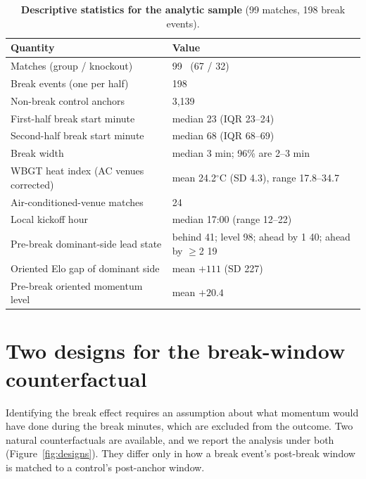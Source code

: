 \documentclass[11pt]{article}
\begin{document}
\begin{table}[t]
\centering\small
\caption{\textbf{Descriptive statistics for the analytic sample} (99 matches, 198 break events).}
\label{tab:desc}
\begin{tabular}{ll}
\toprule
Quantity & Value \\
\midrule
Matches (group / knockout)              & 99 \ (67 / 32) \\
Break events (one per half)             & 198 \\
Non-break control anchors               & 3{,}139 \\
First-half break start minute           & median 23 (IQR 23--24) \\
Second-half break start minute          & median 68 (IQR 68--69) \\
Break width                             & median 3 min; 96\% are 2--3 min \\
WBGT heat index (AC venues corrected)   & mean 24.2$^\circ$C (SD 4.3), range 17.8--34.7 \\
Air-conditioned-venue matches           & 24 \\
Local kickoff hour                      & median 17:00 (range 12--22) \\
Pre-break dominant-side lead state      & behind 41; level 98; ahead by 1 40; ahead by $\geq$2 19 \\
Oriented Elo gap of dominant side       & mean $+111$ (SD 227) \\
Pre-break oriented momentum level       & mean $+20.4$ \\
\bottomrule
\end{tabular}
\end{table}

\section{Two designs for the break-window counterfactual}
\label{sec:designs}

Identifying the break effect requires an assumption about what momentum would have done during the break
minutes, which are excluded from the outcome. Two natural counterfactuals are available, and we report the
analysis under both (Figure~\ref{fig:designs}). They differ only in how a break event's post-break window is
matched to a control's post-anchor window.
\end{document}
